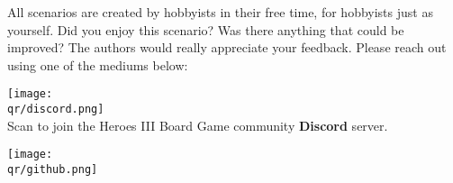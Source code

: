 \clearpage

All scenarios are created by hobbyists in their free time, for hobbyists just as yourself.
Did you enjoy this scenario?
Was there anything that could be improved?
The authors would really appreciate your feedback.
Please reach out using one of the mediums below:

\begin{multicols}{2}
  \bigbreak
  \centering
  \texttt{[image: \\qr/discord.png]}\\
  Scan to join the Heroes III Board Game community \textbf{Discord} server.\\
  \href{\discordurl}{\discordurl}

  \columnbreak
  \texttt{[image: \\qr/github.png]} \\
  \qrgithub \\
  \href{\repourl}{\repourl}
\end{multicols}

\vfill
\begin{center}
\end{center}
